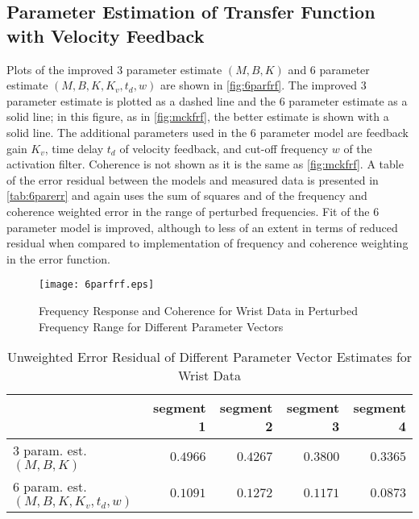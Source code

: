 \documentclass[11pt,a4paper]{article}
\begin{document}
\subsection{Parameter Estimation of Transfer Function with Velocity Feedback}
Plots of the improved 3 parameter estimate $(M, B, K)$ and 6 parameter estimate
$(M, B, K,\allowbreak K_v, t_d, w)$ are shown in \autoref{fig:6parfrf}. The
improved 3 parameter estimate is plotted as a dashed line and the 6 parameter
estimate as a solid line; in this figure, as in \autoref{fig:mckfrf}, the
better estimate is shown with a solid line. The additional parameters used in
the 6 parameter model are feedback gain $K_v$, time delay $t_d$ of velocity
feedback, and cut-off frequency $w$ of the activation filter. Coherence is not
shown as it is the same as \autoref{fig:mckfrf}. A table of the error residual
between the models and measured data is presented in \autoref{tab:6parerr} and
again uses the sum of squares and of the frequency and coherence weighted error
in the range of perturbed frequencies. Fit of the 6 parameter model is
improved, although to less of an extent in terms of reduced residual when
compared to implementation of frequency and coherence weighting in the error
function.

\begin{figure}
    \centering
    \texttt{[image: 6parfrf.eps]}
    \caption{Frequency Response and Coherence for Wrist Data in Perturbed
        Frequency Range for Different Parameter Vectors}
    \label{fig:6parfrf}
\end{figure}

\begin{table}
    \centering
    \begin{tabular}{|l|r|r|r|r|}
        \hline
        \nonumber & segment 1 & segment 2 & segment 3 & segment 4 \\
        \hline
        3 param. est. $(M, B, K)$ &
            $0.4966$ & $0.4267$ & $0.3800$ & $0.3365$ \\
        6 param. est. $(M, B, K, K_v, t_d, w)$ &
            $0.1091$ & $0.1272$ & $0.1171$ & $0.0873$ \\
        \hline
    \end{tabular}
    \caption{Unweighted Error Residual of Different Parameter Vector Estimates
        for Wrist Data}
    \label{tab:6parerr}
\end{table}

\end{document}
